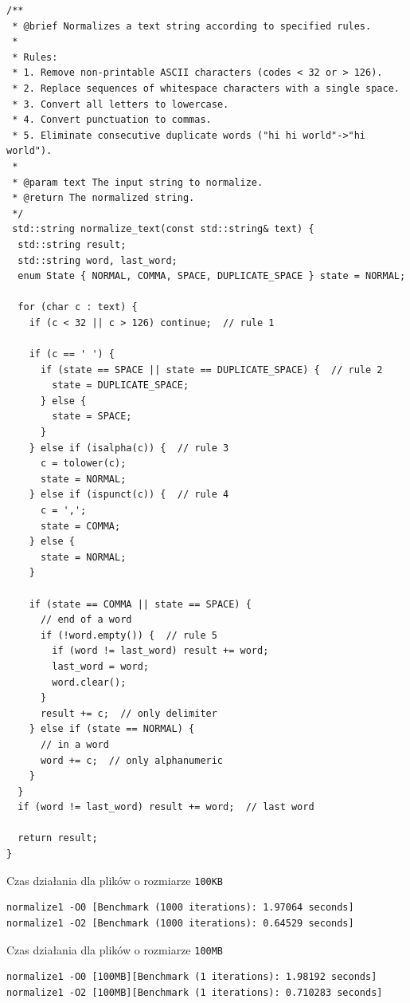 \documentclass[12pt]{article}
\begin{document}
\begin{verbatim}
/**
 * @brief Normalizes a text string according to specified rules.
 *
 * Rules:
 * 1. Remove non-printable ASCII characters (codes < 32 or > 126).
 * 2. Replace sequences of whitespace characters with a single space.
 * 3. Convert all letters to lowercase.
 * 4. Convert punctuation to commas.
 * 5. Eliminate consecutive duplicate words ("hi hi world"->"hi world").
 *
 * @param text The input string to normalize.
 * @return The normalized string.
 */
 std::string normalize_text(const std::string& text) {
  std::string result;
  std::string word, last_word;
  enum State { NORMAL, COMMA, SPACE, DUPLICATE_SPACE } state = NORMAL;

  for (char c : text) {
    if (c < 32 || c > 126) continue;  // rule 1

    if (c == ' ') {
      if (state == SPACE || state == DUPLICATE_SPACE) {  // rule 2
        state = DUPLICATE_SPACE;
      } else {
        state = SPACE;
      }
    } else if (isalpha(c)) {  // rule 3
      c = tolower(c);
      state = NORMAL;
    } else if (ispunct(c)) {  // rule 4
      c = ',';
      state = COMMA;
    } else {
      state = NORMAL;
    }

    if (state == COMMA || state == SPACE) {
      // end of a word
      if (!word.empty()) {  // rule 5
        if (word != last_word) result += word;
        last_word = word;
        word.clear();
      }
      result += c;  // only delimiter
    } else if (state == NORMAL) {
      // in a word
      word += c;  // only alphanumeric
    }
  }
  if (word != last_word) result += word;  // last word

  return result;
}
\end{verbatim}

Czas działania dla plików o rozmiarze \verb|100KB|
\begin{verbatim}
normalize1 -O0 [Benchmark (1000 iterations): 1.97064 seconds]
normalize1 -O2 [Benchmark (1000 iterations): 0.64529 seconds]
\end{verbatim}

Czas działania dla plików o rozmiarze \verb|100MB|
\begin{verbatim}
normalize1 -O0 [100MB][Benchmark (1 iterations): 1.98192 seconds]
normalize1 -O2 [100MB][Benchmark (1 iterations): 0.710283 seconds]
\end{verbatim}
\end{document}
